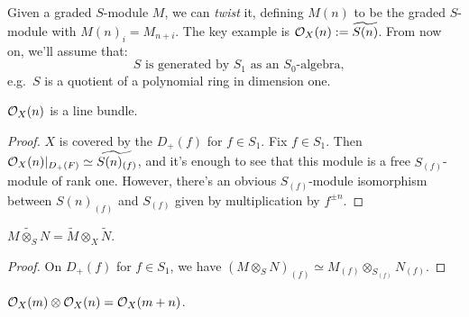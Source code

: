 \documentclass[11pt]{article}
\begin{document}
\begin{Nov1}
Given a graded $S$-module $M$, we can \emph{twist} it, defining $M(n)$ to be the graded $S$-module with $M(n)_i=M_{n+i}$. The key example is $\mathcal{O}_X(n):=\widetilde {S(n)}$. From now on, we'll assume that:
\[\text{ $S$ is generated by $S_1$ as an $S_0$-algebra,}\]
e.g.\ $S$ is a quotient of a polynomial ring in dimension one.
\begin{prop*}
$\mathcal{O}_X(n)$ is a line bundle.
\end{prop*}
\begin{proof}
$X$ is covered by the $D_+(f)$ for $f\in S_1$. Fix $f\in S_1$. Then $\mathcal{O}_X(n)|_{D_+(F)}\simeq \widetilde{S(n)_{(f)}}$, and it's enough to see that this module is a free $S_{(f)}$-module of rank one. However, there's an obvious $S_{(f)}$-module isomorphism between $S(n)_{(f)}$ and $S_{(f)}$ given by multiplication by $f^{\pm n}$.
\end{proof}
\begin{prop}
$\widetilde{M\otimes_SN}=\widetilde M\otimes_X\widetilde N$.
\end{prop}
\begin{proof}
On $D_+(f)$ for $f\in S_1$, we have $(M\otimes_S N)_{(f)}\simeq M_{(f)}\otimes_{S_{(f)}}N_{(f)}$.
\end{proof}
\begin{cor*}
$\mathcal{O}_X(m)\otimes\mathcal{O}_X(n)=\mathcal{O}_X(m+n)$.
\end{cor*}
\end{Nov1}
\end{document}
